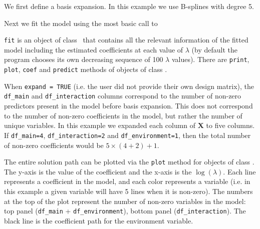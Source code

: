We first define a basis expansion. In this example we use B-splines with degree 5.

\begin{knitrout}\scriptsize
	\color{fgcolor}\begin{kframe}
		\begin{alltt}
			 \hlkwb{<-} \hlstd{(}\hlopt{::}  \hlstd{=} \hlstd{)}
		\end{alltt}
	\end{kframe}
\end{knitrout}

Next we fit the model using the most basic call to \sail

\begin{knitrout}\scriptsize
	\color{fgcolor}\begin{kframe}
		\begin{alltt}
			 \hlkwb{<-} \hlstd{(} \hlopt{$}  \hlopt{$}  \hlopt{$}  \hlstd{= f.basis)}
			\end{alltt}
			\end{kframe}
			\end{knitrout}
			
			\texttt{fit} is an object of class \sail ~that contains all the relevant information of the fitted model including the estimated coefficients at each value of $\lambda$ (by default the program chooses its own decreasing sequence of 100 $\lambda$ values). There are \texttt{print}, \texttt{plot}, \texttt{coef} and \texttt{predict} methods of objects of class \sail. 
			
			When \texttt{expand = TRUE} (i.e. the user did not provide their own design matrix), the \texttt{df\_main} and \texttt{df\_interaction} columns correspond to the number of non-zero predictors present in the model before basis expansion. This does not correspond to the number of non-zero coefficients in the model, but rather the number of unique variables. In this example we expanded each column of $\mathbf{X}$ to five columns. If  \texttt{df\_main=4}, \texttt{df\_interaction=2} and \texttt{df\_environment=1}, then the total number of non-zero coefficients would be $5 \times (4+2) + 1$.  
			
			The entire solution path can be plotted via the \texttt{plot} method for objects of class \sail. The y-axis is the value of the coefficient and the x-axis is the $\log(\lambda)$. Each line represents a coefficient in the model, and each color represents a variable (i.e. in this example a given variable will have 5 lines when it is non-zero). The numbers at the top of the plot represent the number of non-zero variables in the model: top panel (\texttt{df\_main} + \texttt{df\_environment}), bottom panel (\texttt{df\_interaction}). The black line is the coefficient path for the environment variable.  
			

